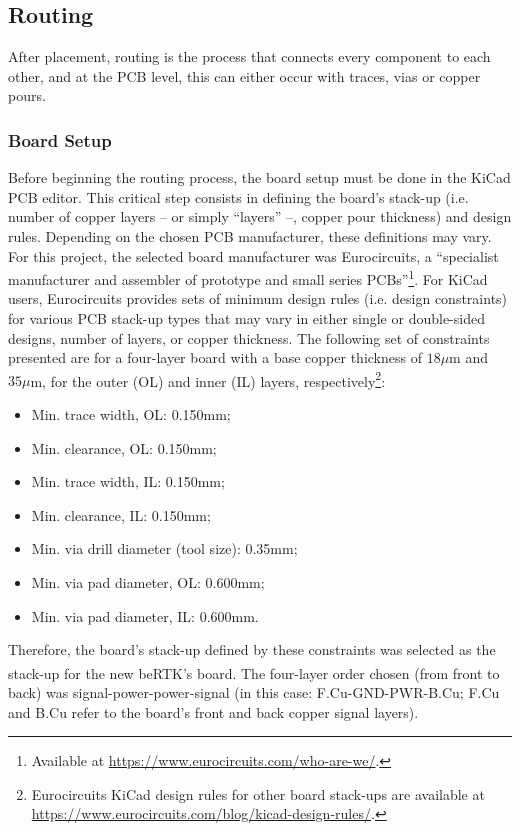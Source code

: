 \subsection{Routing}\label{sec:52_Routing}

After placement, routing is the process that connects every component to each other, and at the PCB level, this can either occur with traces, vias or copper pours.

\subsubsection{Board Setup}\label{sec:521_Board_Setup}

Before beginning the routing process, the board setup must be done in the KiCad PCB editor. This critical step consists in defining the board's stack-up (i.e. number of copper layers -- or simply ``layers'' --, copper pour thickness) and design rules. Depending on the chosen PCB manufacturer, these definitions may vary. For this project, the selected board manufacturer was Eurocircuits, a ``specialist manufacturer and assembler of prototype and small series PCBs''\footnote[19]{Available at \url{https://www.eurocircuits.com/who-are-we/}.}. For KiCad users, Eurocircuits provides sets of minimum design rules (i.e. design constraints) for various PCB stack-up types that may vary in either single or double-sided designs, number of layers, or copper thickness. The following set of constraints presented are for a four-layer board with a base copper thickness of $18 \mu$m and $35 \mu$m, for the outer (OL) and inner (IL) layers, respectively\footnote[20]{Eurocircuits KiCad design rules for other board stack-ups are available at \url{https://www.eurocircuits.com/blog/kicad-design-rules/}.}:
\begin{itemize}
	\item Min. trace width, OL: 0.150mm;
	
	\item Min. clearance, OL: 0.150mm;
	
	\item Min. trace width, IL: 0.150mm;
	
	\item Min. clearance, IL: 0.150mm;

	\item Min. via drill diameter (tool size): 0.35mm;
	
	\item Min. via pad diameter, OL: 0.600mm;
	
	\item Min. via pad diameter, IL: 0.600mm.
\end{itemize}
Therefore, the board's stack-up defined by these constraints was selected as the stack-up for the new beRTK\textsuperscript{\textregistered}'s board. The four-layer order chosen (from front to back) was signal-power-power-signal (in this case: F.Cu-GND-PWR-B.Cu; F.Cu and B.Cu refer to the board's front and back copper signal layers).

